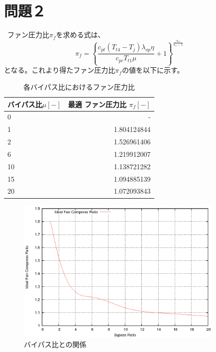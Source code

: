 \section*{\large 問題２}
\ 
ファン圧力比$\pi_f$を求める式は、
\begin{equation}
 \pi_f = \left\{\frac{c_{pt}(T_{t4}-T_j)\lambda_{op} \eta}{c_{pc}T_{t1}\mu}+1\right\}^{\frac{\kappa_c}{\kappa_c-1}}
\end{equation}
となる。これより得たファン圧力比$\pi_f$の値を以下に示す。
\begin{table}[htb]
 \begin{center}
  \caption{各バイパス比におけるファン圧力比}
  \begin{tabular}{|l|r|} \hline
    バイパス比$\mu [-]$  &  最適 ファン圧力比  $\pi_f [-]$ \\  \hline
                      0  &   -                             \\  \hline
                      1  &   1.804124844                   \\  \hline
                      2  &   1.526961406                   \\  \hline
                      6  &   1.219912007                   \\  \hline
                      10 &   1.138721282                   \\  \hline
                      15 &   1.094885139                   \\  \hline
                      20 &   1.072093843                   \\  \hline
   
  \end{tabular}
 \end{center}
\end{table}

\begin{figure}[t]
 \begin{center}
  \includegraphics[width=10.0cm]{eps/body2_1.eps}
  \caption{バイパス比との関係}
 \end{center}
\end{figure}
